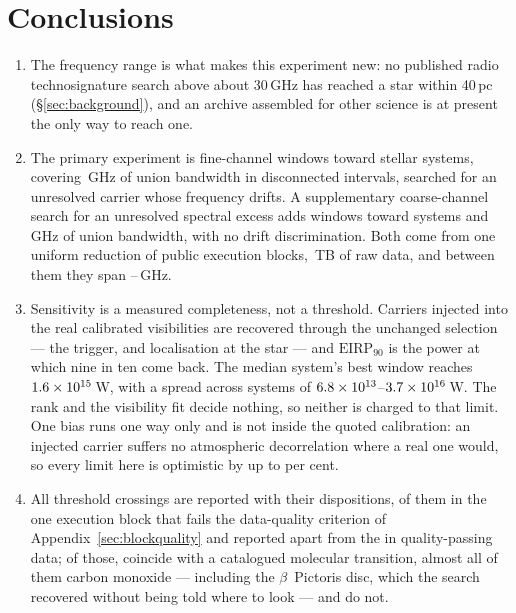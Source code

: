 \section{Conclusions}
\label{sec:conclusions}

\begin{enumerate}[leftmargin=1.6em,itemsep=4pt,topsep=4pt,parsep=0pt]

\item The frequency range is what makes this experiment new: no published
radio technosignature search above about 30\,GHz has reached a star within
40\,pc (\S\ref{sec:background}), and an archive assembled for other science
is at present the only way to reach one.

\item The primary experiment is \NWinA{} fine-channel windows toward
\NSysClassA{} stellar systems, covering \CvUnionA\,GHz of union bandwidth in
disconnected intervals, searched for an unresolved carrier whose frequency
drifts. A supplementary coarse-channel search for an unresolved spectral
excess adds \NWinB{} windows toward \PrSysClassB{} systems and
\CvUnionB\,GHz of union bandwidth, with no drift discrimination. Both come
from one uniform reduction of \NEB{} public execution blocks,
\TotalDataTB\,TB of raw data, and between them they span
\SurvFreqLo--\SurvFreqHi\,GHz.

\item Sensitivity is a measured completeness, not a threshold. Carriers
injected into the real calibrated visibilities are recovered through the
unchanged selection --- the trigger, and localisation at the star --- and
$\mathrm{EIRP}_{90}$ is the power at which nine in ten come back. The median
system's best window reaches $1.6\times10^{15}$\,W, with a spread across
systems of $6.8\times10^{13}$--$3.7\times10^{16}$\,W. The rank and the
visibility fit decide nothing, so neither is charged to that limit. One bias
runs one way only and is not inside the quoted calibration: an injected
carrier suffers no atmospheric decorrelation where a real one would, so
every limit here is optimistic by up to \SensDecorPct{} per cent.

\item All \EvNCrossRaw{} threshold crossings are reported with their
dispositions, \PrFlagXrossWord{} of them in the one execution block
that fails the data-quality criterion of
Appendix~\ref{sec:blockquality} and reported apart from the
\EvNCrossQp{} in quality-passing data; of those, \EvNAttrQp{} coincide with
a catalogued molecular transition, almost all of them carbon monoxide ---
including the $\beta$~Pictoris disc, which the search recovered without
being told where to look --- and \EvNUnattrQp{} do not.


\end{enumerate}
